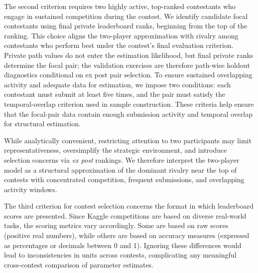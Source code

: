 \documentclass[mnsc]{informs3}
\begin{document}
The second criterion requires two highly active, top-ranked contestants who engage in sustained competition during the contest. 
We identify candidate focal contestants using final private leaderboard ranks, beginning from the top of the ranking. 
This choice aligns the two-player approximation with rivalry among contestants who perform best under the contest's final evaluation criterion. 
Private path values do not enter the estimation likelihood, but final private ranks determine the focal pair; the validation exercises are therefore path-wise holdout diagnostics conditional on ex post pair selection.
To ensure sustained overlapping activity and adequate data for estimation, we impose two conditions: each contestant must submit at least five times, and the pair must satisfy the temporal-overlap criterion used in sample construction.
These criteria help ensure that the focal-pair data contain enough submission activity and temporal overlap for structural estimation.

While analytically convenient, restricting attention to two participants may limit representativeness, oversimplify the strategic environment, and introduce selection concerns via \textit{ex post} rankings.
We therefore interpret the two-player model as a structural approximation of the dominant rivalry near the top of contests with concentrated competition, frequent submissions, and overlapping activity windows.

The third criterion for contest selection concerns the format in which leaderboard scores are presented.
Since Kaggle competitions are based on diverse real-world tasks, the scoring metrics vary accordingly.
Some are based on raw scores (positive real numbers), while others are based on accuracy measures (expressed as percentages or decimals between 0 and 1).
Ignoring these differences would lead to inconsistencies in units across contests, complicating any meaningful cross-contest comparison of parameter estimates.
\end{document}
